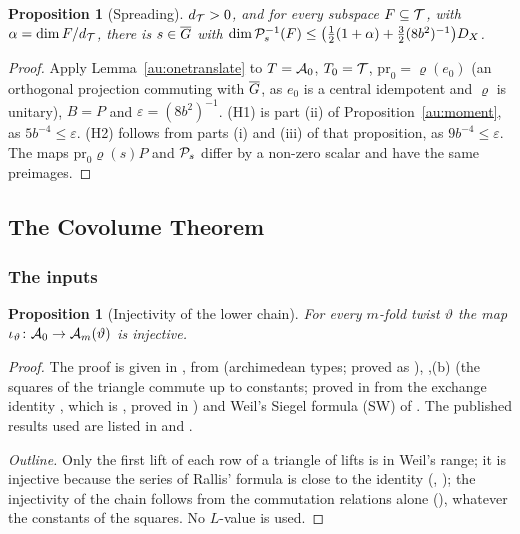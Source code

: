 \documentclass[10pt]{amsart}
\newtheorem{proposition}[theorem]{Proposition}
\theoremstyle{definition}
\theoremstyle{remark}
\begin{document}
\begin{proposition}[Spreading]\label{au:spread}
$d_{\mathcal T}>0$, and for every subspace $F\subseteq\mathcal T$, with $\alpha=\dim F/d_{\mathcal T}$, there is
$s\in\overline G$ with $\dim\mathcal P_s^{-1}(F)\le\bigl(\tfrac12(1+\alpha)+\tfrac32(8b^2)^{-1}\bigr)D_X$.
\end{proposition}
\begin{proof}
Apply Lemma~\ref{au:onetranslate} to $T=\mathcal A_0$, $T_0=\mathcal T$, $\mathrm{pr}_0=\varrho(e_0)$ (an
orthogonal projection commuting with $\overline G$, as $e_0$ is a central idempotent and $\varrho$ is
unitary), $B=P$ and $\varepsilon=(8b^2)^{-1}$. (H1) is part (ii) of Proposition~\ref{au:moment}, as $5b^{-4}\le\varepsilon$. (H2)
follows from parts (i) and (iii) of that proposition, as $9b^{-4}\le\varepsilon$. The maps $\mathrm{pr}_0\varrho(s)P$ and
$\mathcal P_s$ differ by a non-zero scalar and have the same preimages.
\end{proof}

\subsection{The Covolume Theorem}\label{ss:au-proofC}

\subsubsection*{The inputs}

\begin{proposition}[Injectivity of the lower chain]\label{au:inj}
For every $m$-fold twist $\vartheta$ the map $\iota_\vartheta\colon\mathcal A_0\to\mathcal A_m(\vartheta)$ is
injective.
\end{proposition}
\begin{proof}
The proof is given in {\cite[\S2.5]{P53}}, from {\cite[Lemma~2.10]{P53}} (archimedean types; proved as
{\cite[Proposition~4.46]{P53}}), {\cite[Theorem~2.21(a)]{P53}},(b) (the squares of the triangle commute up to
constants; proved in {\cite[\S\S4.1--4.4]{P53}} from the exchange identity
{\cite[Theorem~2.27]{P53}}, which is {\cite[Theorem~3.2]{P53}}, proved in {\cite[\S\S3.1--3.4]{P53}}) and
Weil's Siegel formula (SW) of {\cite[Lemma~2.13]{P53}}. The published results used are listed in
{\cite[\S3.3.9]{P53}} and {\cite[\S4.2.4]{P53}}.

\emph{Outline.} Only the first lift of each row of a triangle of lifts is in Weil's range; it is
injective because the series of Rallis' formula is close to the identity ({\cite[Lemma~2.11]{P53}},
{\cite[Proposition~2.16]{P53}}); the injectivity of the chain follows from the commutation relations
alone ({\cite[Proposition~2.7]{P53}}), whatever the constants of the squares. No $L$-value is used.
\end{proof}
\end{document}

